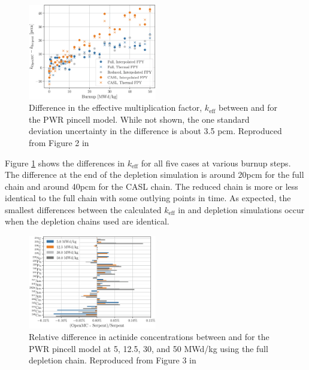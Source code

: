 \begin{figure}[htpb]
    \centering
    \includegraphics[width=0.5\textwidth]{figs/ch2/serpent_openmc_keff.png}
    \caption[Difference in the effective multiplication factor, $k_\text{eff}$
    between OpenMC and Serpent for the PWR pincell model.]{Difference in the
    effective multiplication factor, $k_\text{eff}$ between \OpenMC and \SerpentTWO
    for the PWR pincell model. While not shown, the one standard deviation
    uncertainty in the difference is about 3.5 pcm. Reproduced from Figure 2 in
    \cite{romano_depletion_2021}}
    \label{fig:pwr-serpent-openmc-keff}
\end{figure}

Figure \ref{fig:pwr-serpent-openmc-keff} shows the differences in $k_\text{eff}$
for all five cases at various burnup steps. The difference at the end of the depletion simulation is
around 20pcm for the full chain and around 40pcm for the CASL chain. The
reduced chain is more or less identical to the full chain with some outlying
points in time. As expected, the smallest differences between the calculated
$k_\text{eff}$ in \SerpentTWO and \OpenMC depletion simulations occur when the
depletion chains used are identical.

\begin{figure}[htpb]
    \centering
    \includegraphics[width=0.5\textwidth]{figs/ch2/serpent_openmc_actinides.png}
    \caption[Relative difference in actinide concentrations between OpenMC and
    Serpent for the PWR pincell model.]{Relative difference in actinide
    concentrations between \OpenMC and \SerpentTWO for the PWR pincell model at 5,
    12.5, 30, and 50 MWd/kg using the full depletion chain. Reproduced from
    Figure 3 in \cite{romano_depletion_2021}}
    \label{fig:pwr-serpent-openmc-actinides}
\end{figure}

